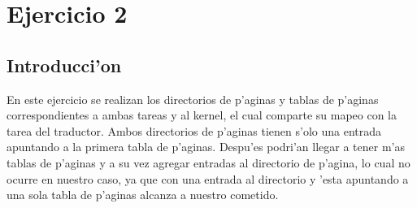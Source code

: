 \documentclass[11pt]{article}
\begin{document}
\newpage

\section{Ejercicio 2}
\subsection{Introducci'on} En este ejercicio se realizan los directorios de p'aginas y tablas de p'aginas correspondientes a ambas tareas y al kernel, el cual comparte su mapeo con la tarea del traductor. Ambos directorios de p'aginas tienen s'olo una entrada apuntando a la primera tabla de p'aginas. Despu'es podri'an llegar a tener m'as tablas de p'aginas y a su vez agregar entradas al directorio de p'agina, lo cual no ocurre en nuestro caso, ya que con una entrada al directorio y 'esta apuntando a una sola tabla de p'aginas alcanza a nuestro cometido.
\end{document}
